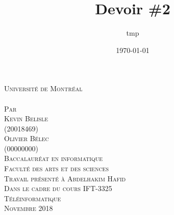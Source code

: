 \documentclass[a4paper,12pt]{article}
\date{\today}
\title{Devoir \#2}
\author{tmp}
\newcommand{\Author}{Kevin Belisle}
\newcommand{\Authorr}{Olivier Bélec}
\newcommand{\MatriculeAuthor}{20018469}
\newcommand{\MatriculeAuthorr}{00000000}
\newcommand{\Teacher}{Abdelhakim Hafid}
\newcommand{\ClassNum}{IFT-3325}
\newcommand{\ClassName}{Téléinformatique}
\newcommand{\DateMMMMYYYY}{Novembre 2018}
\begin{document}
	\begin{titlepage} 
		\begin{center}
			\textsc{\normalsize Université de Montréal}\\[3cm]
			 
			\textsc{\LARGE \@title}\\[2.5cm]
			
			\textsc{\small Par}\\[0.25cm]
			\textsc{\LARGE \Author}\\[0.25cm]
			\textsc{\normalsize (\MatriculeAuthor)}\\[0.25cm]
			\textsc{\LARGE \Authorr}\\[0.25cm]
			\textsc{\normalsize (\MatriculeAuthorr)}\\[2.25cm]
			
			\textsc{\normalsize Baccalauréat en informatique}\\
			\textsc{\normalsize Faculté des arts et des sciences}\\[2.5cm]
			
			\textsc{\small Travail présenté à \Teacher}\\
			\textsc{\small Dans le cadre du cours \ClassNum}\\
			\textsc{\small \ClassName}\\[2.75cm]
			
			\textsc{\normalsize \DateMMMMYYYY}\\[1.5cm]
		\end{center}
	\end{titlepage}
\end{document}

